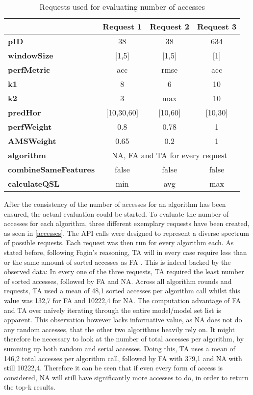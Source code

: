 \begin{table}[h]
\centering
    \begin{tabular}{ l | c  c  c }
        \toprule
        &
\textbf{Request 1}      
& \textbf{Request 2}   
& \textbf{Request 3} \\\midrule

\textbf{pID} & 38 & 38 & 634 \\\midrule
\textbf{windowSize} & [1,5] & [1,5] & [1] \\\midrule
\textbf{perfMetric} & acc & rmse & acc \\\midrule
\textbf{k1} & 8 & 6 &10 \\\midrule
\textbf{k2} & 3 & max & 10 \\\midrule
\textbf{predHor} & [10,30,60] & [10,60] & [10,30]\\\midrule
\textbf{perfWeight} & 0.8 & 0.78 & 1 \\\midrule
\textbf{AMSWeight} & 0.65 & 0.2 & 1\\\midrule
\textbf{algorithm}  & \multicolumn{3}{c}{NA, FA and TA for every request}  \\\midrule
\textbf{combineSameFeatures} & false & false & false \\\midrule
\textbf{calculateQSL} & min & avg & max\\
        \bottomrule
    \end{tabular}
\caption{Requests used for evaluating number of accesses} \label{accesses}
\end{table}

After the consistency of the number of accesses for an algorithm has been ensured, the actual evaluation could be started. To evaluate the number of accesses for each algorithm, three different exemplary requests have been created, as seen in \autoref{accesses}. The API calls were designed to represent a diverse spectrum of possible requests. Each request was then run for every algorithm each. As stated before, following Fagin’s reasoning, TA will in every case require less than or the same amount of sorted accesses as FA \cite{fagin2002}. This is indeed backed by the observed data: In every one of the three requests, TA required the least number of sorted accesses, followed by FA and NA. Across all algorithm rounds and requests, TA used a mean of 48,1 sorted accesses per algorithm call whilst this value was 132,7 for FA and 10222,4 for NA. The computation advantage of FA and TA over naïvely iterating through the entire model/model set list is apparent. This observation however lacks informative value, as NA does not do any random accesses, that the other two algorithms heavily rely on. It might therefore be necessary to look at the number of total accesses per algorithm, by summing up both random and serial accesses. Doing this, TA uses a mean of 146,2 total accesses per algorithm call, followed by FA with 379,1 and NA with still 10222,4. Therefore it can be seen that if even every form of access is considered, NA will still have significantly more accesses to do, in order to return the top-k results. 

